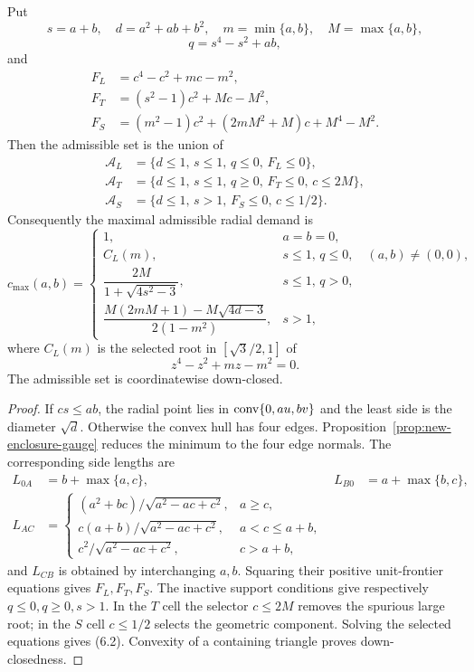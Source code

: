 \begin{proposition}
\label{prop:new-exact-local-set}
\label{prop:exact-admissible-set}
Put
\[
 s=a+b,\quad d=a^2+ab+b^2,\quad
 m=\min\{a,b\},\quad M=\max\{a,b\},
\]
\[
 q=s^4-s^2+ab,
\]
and
\begin{align*}
 F_L&=c^4-c^2+mc-m^2,\\
 F_T&=(s^2-1)c^2+Mc-M^2,\\
 F_S&=(m^2-1)c^2+(2mM^2+M)c+M^4-M^2.
\end{align*}
Then the admissible set is the union of
\begin{align*}
 \mathcal A_L&=\{d\le1,\,s\le1,\,q\le0,\,F_L\le0\},\\
 \mathcal A_T&=\{d\le1,\,s\le1,\,q\ge0,\,F_T\le0,\,c\le2M\},\\
 \mathcal A_S&=\{d\le1,\,s>1,\,F_S\le0,\,c\le1/2\}.
\end{align*}
Consequently the maximal admissible radial demand is
\[
 c_{\max}(a,b)=
 \begin{cases}
  1,&a=b=0,\\
  C_L(m),&s\le1,\,q\le0,
  \quad (a,b)\ne(0,0),\\
  \dfrac{2M}{1+\sqrt{4s^2-3}},&s\le1,\,q>0,\\[3mm]
  \dfrac{M(2mM+1)-M\sqrt{4d-3}}{2(1-m^2)},&s>1,
 \end{cases}
 \label{eq:radial-envelope}
 \tag{6.2}
\]
where $C_L(m)$ is the selected root in $[\sqrt3/2,1]$ of
\[
 z^4-z^2+mz-m^2=0.
\]
The admissible set is coordinatewise down-closed.
\end{proposition}

\begin{proof}
If $cs\le ab$, the radial point lies in $\mathrm{conv}\{0,au,bv\}$ and the least
side is the diameter $\sqrt d$.  Otherwise the convex hull has four edges.
Proposition~\ref{prop:new-enclosure-gauge} reduces the minimum to the four
edge normals.  The corresponding side lengths are
\begin{align*}
 L_{0A}&=b+\max\{a,c\},&
 L_{B0}&=a+\max\{b,c\},\\
 L_{AC}&=
 \begin{cases}
 (a^2+bc)/\sqrt{a^2-ac+c^2},&a\ge c,\\
 c(a+b)/\sqrt{a^2-ac+c^2},&a<c\le a+b,\\
 c^2/\sqrt{a^2-ac+c^2},&c>a+b,
 \end{cases}
\end{align*}
and $L_{CB}$ is obtained by interchanging $a,b$.  Squaring their positive
unit-frontier equations gives $F_L,F_T,F_S$.  The inactive support conditions
give respectively $q\le0,q\ge0,s>1$.  In the $T$ cell the selector
$c\le2M$ removes the spurious large root; in the $S$ cell $c\le1/2$ selects
the geometric component.  Solving the selected equations gives (6.2).
Convexity of a containing triangle proves down-closedness.
\end{proof}

